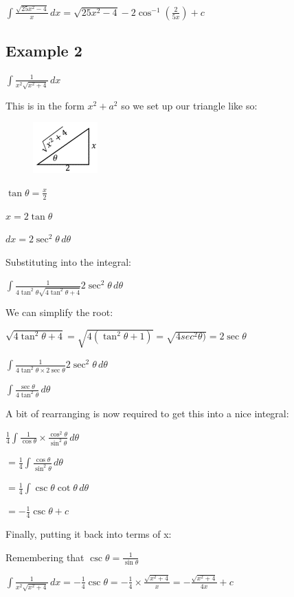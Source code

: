 \documentclass[../main.tex]{subfiles}
\begin{document}
    \(\int \frac{\sqrt{25x^2-4}}{x}\,dx=\sqrt{25x^2-4}-2\cos^{-1}{(\frac{2}{5x})}+c\)

    \subsection*{Example 2}
    \(\int \frac{1}{x^2\sqrt{x^2+4}}\,dx\)

    This is in the form \(x^2+a^2\) so we set up our triangle like so:
    \begin{figure}[h]
        \centering
        \includegraphics{images/trigsub5.png}
    \end{figure}

    \(\tan{\theta}=\frac{x}{2}\)

    \(x=2\tan{\theta}\)

    \(dx=2\sec^2{\theta}\,d\theta\)

    Substituting into the integral:

    \(\int \frac{1}{4\tan^2{\theta}\sqrt{4\tan^2{\theta}+4}}2\sec^2{\theta}\,d\theta\)

    We can simplify the root:

    \(\sqrt{4\tan^2{\theta}+4}=\sqrt{4(\tan^2{\theta}+1)}=\sqrt{4sec^2{\theta)}}=2\sec{\theta}\)

    \(\int \frac{1}{4\tan^2{\theta}\times 2\sec{\theta}}2\sec^2{\theta}\,d\theta\)

    \(\int \frac{\sec{\theta}}{4\tan^2{\theta}}\,d\theta\)

    A bit of rearranging is now required to get this into a nice integral:

    \(\frac{1}{4}\int \frac{1}{\cos{\theta}}\times \frac{\cos^2{\theta}}{\sin^2{\theta}}\,d\theta\)

    \(=\frac{1}{4}\int \frac{\cos{\theta}}{\sin^2{\theta}}\,d\theta\)

    \(=\frac{1}{4}\int \csc{\theta} \cot{\theta}\,d\theta\)

    \(=-\frac{1}{4}\csc{\theta}+c\)

    Finally, putting it back into terms of x:

    Remembering that \(\csc{\theta}=\frac{1}{\sin{\theta}}\)

    \(\int \frac{1}{x^2\sqrt{x^2+4}}\,dx=-\frac{1}{4}\csc{\theta}=-\frac{1}{4}\times \frac{\sqrt{x^2+4}}{x}=-\frac{\sqrt{x^2+4}}{4x}+c\)
\end{document}
